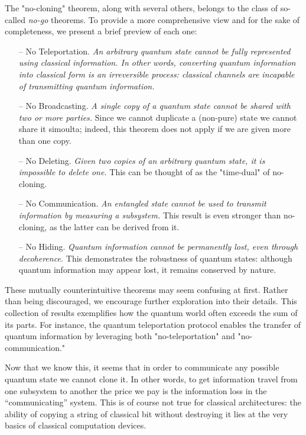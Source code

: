\begin{tcolorbox}[colframe=palette-main, breakable, title=\textbf{Other "no-go" theorems}]
    The "no-cloning" theorem, along with several others, belongs to the class of so-called \textit{no-go} theorems. To provide a more comprehensive view and for the sake of completeness, we present a brief preview of each one:
    \begin{itemize}
        \item[--] No Teleportation. \textit{An arbitrary quantum state cannot be fully represented using classical information. In other words, converting quantum information into classical form is an irreversible process: classical channels are incapable of transmitting quantum information.}
        \item[--] No Broadcasting. \textit{A single copy of a quantum state cannot be shared with two or more parties.} Since we cannot duplicate a (non-pure) state we cannot share it simoulta; indeed, this theorem does not apply if we are given more than one copy.
        \item[--] No Deleting. \textit{Given two copies of an arbitrary quantum state, it is impossible to delete one.} This can be thought of as the "time-dual" of no-cloning.
        \item[--] No Communication. \textit{An entangled state cannot be used to transmit information by measuring a subsystem.} This result is even stronger than no-cloning, as the latter can be derived from it.
        \item[--] No Hiding. \textit{Quantum information cannot be permanently lost, even through decoherence.} This demonstrates the robustness of quantum states: although quantum information may appear lost, it remains conserved by nature.
    \end{itemize}
    These mutually counterintuitive theorems may seem confusing at first. Rather than being discouraged, we encourage further exploration into their details. This collection of results exemplifies how the quantum world often exceeds the sum of its parts. For instance, the quantum teleportation protocol enables the transfer of quantum information by leveraging both "no-teleportation" and "no-communication."
\end{tcolorbox}


Now that we know this, it seems that in order to communicate any possible quantum state we cannot clone it. In other words, to get information travel from one subsystem to another the price we pay is the information loss in the ``communicating'' system. This is of course not true for classical architectures: the ability of copying a string of classical bit without destroying it lies at the very basics of classical computation devices.

